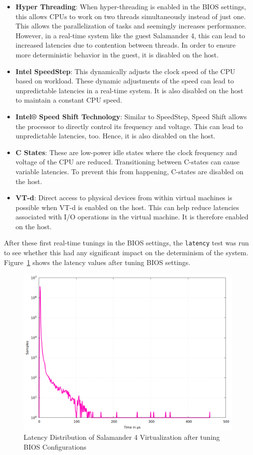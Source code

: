\documentclass[MMR,Master,english]{style/twbook}
\begin{document}
\begin{itemize}
	\item \textbf{Hyper Threading}: When hyper-threading is enabled in the BIOS settings, this allows CPUs to work on two threads simultaneously instead of just one. This allows the parallelization of tasks and seemingly increases performance. However, in a real-time system like the guest Salamander 4, this can lead to increased latencies due to contention between threads. In order to ensure more deterministic behavior in the guest, it is disabled on the host.
	\item \textbf{Intel SpeedStep}: This dynamically adjusts the clock speed of the CPU based on workload. These dynamic adjustments of the speed can lead to unpredictable latencies in a real-time system. It is also disabled on the host to maintain a constant CPU speed.
	\item \textbf{Intel® Speed Shift Technology}: Similar to SpeedStep, Speed Shift allows the processor to directly control its frequency and voltage. This can lead to unpredictable latencies, too. Hence, it is also disabled on the host.
	\item \textbf{C States}: These are low-power idle states where the clock frequency and voltage of the CPU are reduced. Transitioning between C-states can cause variable latencies. To prevent this from happening, C-states are disabled on the host.
	\item \textbf{VT-d}: Direct access to physical devices from within virtual machines is possible when VT-d is enabled on the host. This can help reduce latencies associated with I/O operations in the virtual machine. It is therefore enabled on the host.
\end{itemize}

\noindent After these first real-time tunings in the BIOS settings, the \texttt{latency} test was run to see whether this had any significant impact on the determinism of the system. Figure~\ref{fig:gnuplot_max_latency_taskset} shows the latency values after tuning BIOS settings.

\begin{figure}[H]
	\centering
	\includegraphics[width=0.7\columnwidth]{img/implementation/gnuplot_max_latency_taskset.png}
	\caption[Latency Distribution of Salamander 4 after BIOS Configurations]{Latency Distribution of Salamander 4 Virtualization after tuning BIOS Configurations}
	\label{fig:gnuplot_max_latency_taskset}
\end{figure}
\end{document}
